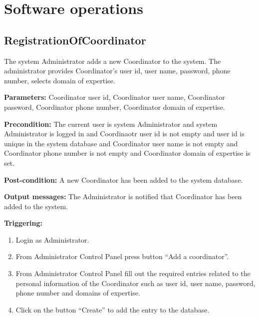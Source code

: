\chapter{Software operations}
\label{chap:soptware_operations}

\section{RegistrationOfCoordinator}
\label{operation:RegistrationOfCoordinator}
The system Administrator adds a new Coordinator to the system. The administrator 
provides Coordinator's user id, user name, password, phone number, selects
domain of expertise.

\begin{description}

\item \textbf{Parameters:} Coordinator user id, Coordinator user name,
Coordinator password, Coordinator phone number, Coordinator domain of expertise.
\item \textbf{Precondition:} The current user is system Administrator and system
Administrator is logged in and Coordinaotr user id is not empty and user id is unique in the system database
and Coordinator user name is not empty and Coordinator phone number is not empty and Coordinator domain of expertise is
set.
\item \textbf{Post-condition:} A new Coordinator has been added to the system
database.
\item \textbf{Output messages:} The Administrator is notified that Coordinator
has been added to the system.

\item \textbf{Triggering:}
\begin{enumerate}
\item Login as Administrator.
\item From Administrator Control Panel press button ``Add a coordinator''.
\item From Administrator Control Panel fill out the required entries related to
the personal information of the Coordinator such as user id, user name,
password, phone number and domains of expertise.
\item Click on the button ``Create'' to add the entry to the database.
\end{enumerate}
 
\end{description}


